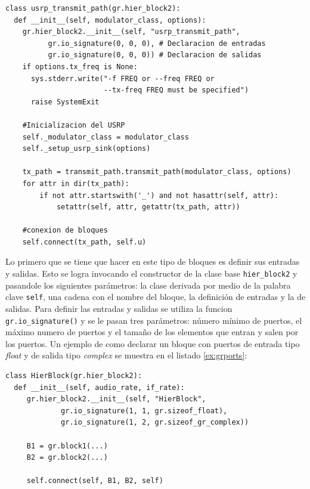 \begin{lstlisting}[float, frame=single, label=ex:usrptx, caption={Constructor del bloque transmisor
del USRP.}] 
class usrp_transmit_path(gr.hier_block2):
  def __init__(self, modulator_class, options):
    gr.hier_block2.__init__(self, "usrp_transmit_path",
          gr.io_signature(0, 0, 0), # Declaracion de entradas
          gr.io_signature(0, 0, 0)) # Declaracion de salidas
    if options.tx_freq is None:
      sys.stderr.write("-f FREQ or --freq FREQ or 
                       --tx-freq FREQ must be specified")
      raise SystemExit

    #Inicializacion del USRP
    self._modulator_class = modulator_class
    self._setup_usrp_sink(options)

    tx_path = transmit_path.transmit_path(modulator_class, options)
    for attr in dir(tx_path): 
        if not attr.startswith('_') and not hasattr(self, attr):
            setattr(self, attr, getattr(tx_path, attr))

    #conexion de bloques
    self.connect(tx_path, self.u)
\end{lstlisting}

Lo primero que se tiene que hacer en este tipo de bloques es definir sus entradas y salidas. Esto se
logra invocando el constructor de la clase base \verb|hier_block2| y pasandole los siguientes
par\'ametros: la clase derivada por medio de la palabra clave \verb|self|, una cadena con el nombre
del bloque, la definici\'on de entradas y la de salidas. Para definir las entradas y salidas se
utiliza la funcion \verb|gr.io_signature()| y se le pasan tres par\'ametros: n\'umero m\'inimo de
puertos, el m\'aximo numero de puertos y el tama\~no de los elementos que entran y salen por los
puertos. Un ejemplo de como declarar un bloque con puertos de entrada tipo \emph{float} y de salida
tipo \emph{complex} se muestra en el listado \ref{ex:grports}:

\begin{lstlisting}[float, frame=single, label=ex:grports, caption={Ejemplo de declaraci\'on de
entradas y salidas para un bloque jer\'arquico.}]
class HierBlock(gr.hier_block2):
  def __init__(self, audio_rate, if_rate):
     gr.hier_block2.__init__(self, "HierBlock",
             gr.io_signature(1, 1, gr.sizeof_float),
             gr.io_signature(1, 2, gr.sizeof_gr_complex))

     B1 = gr.block1(...)
     B2 = gr.block2(...)
 
     self.connect(self, B1, B2, self)
\end{lstlisting}

